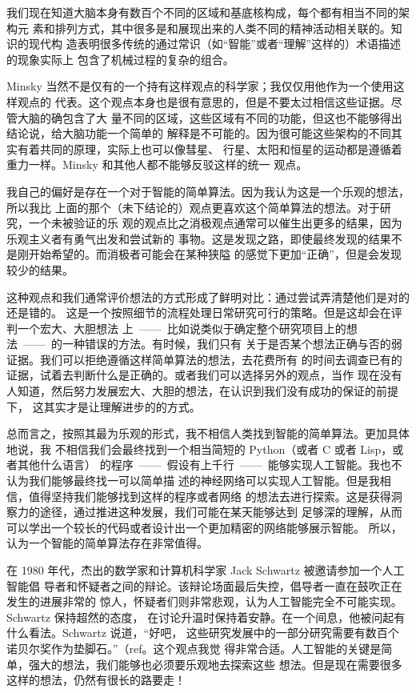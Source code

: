     我们现在知道大脑本身有数百个不同的区域和基底核构成，每个都有相当不同的架构元
    素和排列方式，其中很多是和展现出来的人类不同的精神活动相关联的。知识的现代构
    造表明很多传统的通过常识（如“智能”或者“理解”这样的）术语描述的现象实际上
    包含了机械过程的复杂的组合。

Minsky 当然不是仅有的一个持有这样观点的科学家；我仅仅用他作为一个使用这样观点的
代表。这个观点本身也是很有意思的，但是不要太过相信这些证据。尽管大脑的确包含了大
量不同的区域，这些区域有不同的功能，但这也不能够得出结论说，给大脑功能一个简单的
解释是不可能的。因为很可能这些架构的不同其实有着共同的原理，实际上也可以像彗星、
行星、太阳和恒星的运动都是遵循着重力一样。Minsky 和其他人都不能够反驳这样的统一
观点。

我自己的偏好是存在一个对于智能的简单算法。因为我认为这是一个乐观的想法，所以我比
上面的那个（未下结论的）观点更喜欢这个简单算法的想法。对于研究，一个未被验证的乐
观的观点比之消极观点通常可以催生出更多的结果，因为乐观主义者有勇气出发和尝试新的
事物。这是发现之路，即使最终发现的结果不是刚开始希望的。而消极者可能会在某种狭隘
的感觉下更加“正确”，但是会发现较少的结果。

这种观点和我们通常评价想法的方式形成了鲜明对比：通过尝试弄清楚他们是对的还是错的。
这是一个按照细节的流程处理日常研究可行的策略。但是这却会在评判一个宏大、大胆想法
上~——~比如说类似于确定整个研究项目上的想法~——~的一种错误的方法。有时候，我们只有
关于是否某个想法正确与否的弱证据。我们可以拒绝遵循这样简单算法的想法，去花费所有
的时间去调查已有的证据，试着去判断什么是正确的。或者我们可以选择另外的观点，当作
现在没有人知道，然后努力发展宏大、大胆的想法，在认识到我们没有成功的保证的前提下，
这其实才是让理解进步的的方式。

总而言之，按照其最为乐观的形式，我不相信人类找到智能的简单算法。更加具体地说，我
不相信我们会最终找到一个相当简短的 Python（或者 C 或者 Lisp，或者其他什么语言）
的程序~——~假设有上千行~——~能够实现人工智能。我也不认为我们能够最终找一可以简单描
述的神经网络可以实现人工智能。但是我相信，值得坚持我们能够找到这样的程序或者网络
的想法去进行探索。这是获得洞察力的途径，通过推进这种发展，我们可能在某天能够达到
足够深的理解，从而可以学出一个较长的代码或者设计出一个更加精密的网络能够展示智能。
所以，认为一个智能的简单算法存在非常值得。

在 1980 年代，杰出的数学家和计算机科学家 Jack Schwartz 被邀请参加一个人工智能倡
导者和怀疑者之间的辩论。该辩论场面最后失控，倡导者一直在鼓吹正在发生的进展非常的
惊人，怀疑者们则非常悲观，认为人工智能完全不可能实现。Schwartz 保持超然的态度，
在讨论升温时保持着安静。在一个间息，他被问起有什么看法。Schwartz 说道，“好吧，
这些研究发展中的一部分研究需要有数百个诺贝尔奖作为垫脚石。”（ref。这个观点我觉
  得非常合适。人工智能的关键是简单，强大的想法，我们能够也必须要乐观地去探索这些
  想法。但是现在需要很多这样的想法，仍然有很长的路要走！
